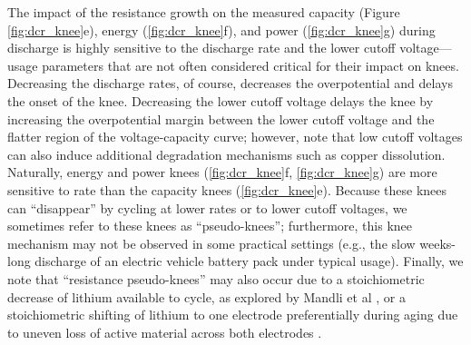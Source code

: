 \documentclass[journal=jpclcd,manuscript=article]{achemso}
\begin{document}
The impact of the resistance growth on the measured capacity (Figure \ref{fig:dcr_knee}e), energy (\ref{fig:dcr_knee}f), and power (\ref{fig:dcr_knee}g) during discharge is highly sensitive to the discharge rate and the lower cutoff voltage---usage parameters that are not often considered critical for their impact on knees. Decreasing the discharge rates, of course, decreases the overpotential and delays the onset of the knee.
Decreasing the lower cutoff voltage delays the knee by increasing the overpotential margin between the lower cutoff voltage and the flatter region of the voltage-capacity curve; however, note that low cutoff voltages can also induce additional degradation mechanisms such as copper dissolution\cite{fear_elucidating_2018, carter_x-ray_2018}. Naturally, energy and power knees (\ref{fig:dcr_knee}f, \ref{fig:dcr_knee}g) are more sensitive to rate than the capacity knees (\ref{fig:dcr_knee}e). Because these knees can ``disappear'' by cycling at lower rates or to lower cutoff voltages, we sometimes refer to these knees as ``pseudo-knees''; furthermore, this knee mechanism may not be observed in some practical settings (e.g., the slow weeks-long discharge of an electric vehicle battery pack under typical usage).
Finally, we note that ``resistance pseudo-knees'' may also occur due to a stoichiometric decrease of lithium available to cycle, as explored by Mandli et al \cite{mandli_analysis_2019}, or a stoichiometric shifting of lithium to one electrode preferentially during aging due to uneven loss of active material across both electrodes \cite{lin_comprehensive_2013}.
\end{document}
